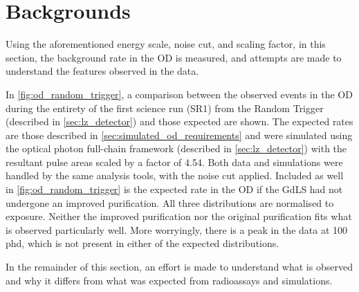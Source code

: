 \section{Backgrounds}
\label{sec:od_analysis_backgrounds}
\par
Using the aforementioned energy scale, noise cut, and scaling factor, in this section, the background rate in the OD is measured, and attempts are made to understand the features observed in the data.
\par
In \autoref{fig:od_random_trigger}, a comparison between the observed events in the OD during the entirety of the first science run (SR1) from the Random Trigger (described in \autoref{sec:lz_detector}) and those expected are shown.
The expected rates are those described in \autoref{sec:simulated_od_requirements} and were simulated using the optical photon full-chain framework (described in \autoref{sec:lz_detector}) with the resultant pulse areas scaled by a factor of 4.54.
Both data and simulations were handled by the same analysis tools, with the noise cut applied.
Included as well in \autoref{fig:od_random_trigger} is the expected rate in the OD if the GdLS had not undergone an improved purification.
All three distributions are normalised to exposure.
Neither the improved purification nor the original purification fits what is observed particularly well.
More worryingly, there is a peak in the data at 100 phd, which is not present in either of the expected distributions.
\par
In the remainder of this section, an effort is made to understand what is observed and why it differs from what was expected from radioassays and simulations.




